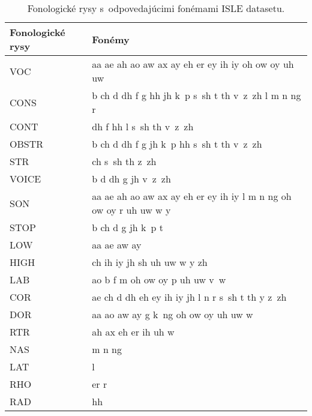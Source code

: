 \begin{table}[h]
\centering
\begin{tabularx}{\textwidth}{@{}lX@{}}
\toprule
Fonologické rysy & Fonémy                                                            \\ \midrule
VOC                    & aa ae ah ao aw ax ay eh er ey ih iy oh ow oy uh uw                \\
CONS                   & b ch d dh f g hh jh k~p s~sh t th v~z~zh l m n ng r               \\
CONT                   & dh f hh l s~sh th v~z~zh                                          \\
OBSTR                  & b ch d dh f g jh k~p hh s~sh t th v~z~zh                          \\
STR                    & ch s~sh th z~zh                                                   \\
VOICE                  & b d dh g jh v~z~zh                                                \\
SON                    & aa ae ah ao aw ax ay eh er ey ih iy l m n ng oh ow oy r uh uw w y \\
STOP                   & b ch d g jh k~p t                                                 \\
LOW                    & aa ae aw ay                                                       \\
HIGH                   & ch ih iy jh sh uh uw w y zh                                       \\
LAB                    & ao b f m oh ow oy p uh uw v~w                                     \\
COR                    & ae ch d dh eh ey ih iy jh l n r s~sh t th y z~zh                  \\
DOR                    & aa ao aw ay g k~ng oh ow oy uh uw w                               \\
RTR                    & ah ax eh er ih uh w                                               \\
NAS                    & m n ng                                                            \\
LAT                    & l                                                                 \\
RHO                    & er r                                                              \\
RAD                    & hh                                                                \\ \bottomrule
\end{tabularx}
\caption{Fonologické rysy s~odpovedajúcimi fonémami ISLE datasetu.}
\label{tab:phonolog-features-set}
\end{table}


